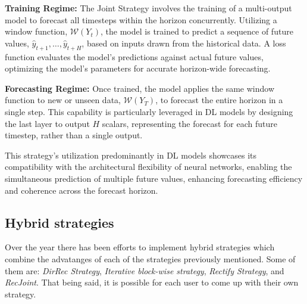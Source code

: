 \documentclass{article}
\begin{document}
\textbf{Training Regime:} The Joint Strategy involves the training of a multi-output model to forecast all timesteps within the horizon concurrently. Utilizing a window function, $\mathcal{W}(Y_t)$, the model is trained to predict a sequence of future values, $\hat{y}_{t+1}, \ldots, \hat{y}_{t+H}$, based on inputs drawn from the historical data. A loss function evaluates the model's predictions against actual future values, optimizing the model's parameters for accurate horizon-wide forecasting.

\textbf{Forecasting Regime:} Once trained, the model applies the same window function to new or unseen data, $\mathcal{W}(Y_T)$, to forecast the entire horizon in a single step. This capability is particularly leveraged in DL models by designing the last layer to output $H$ scalars, representing the forecast for each future timestep, rather than a single output.

This strategy's utilization predominantly in DL models showcases its compatibility with the architectural flexibility of neural networks, enabling the simultaneous prediction of multiple future values, enhancing forecasting efficiency and coherence across the forecast horizon.


\subsection{Hybrid strategies}
Over the year there has been efforts to implement hybrid strategies which combine the advatanges
of each of the strategies previously mentioned. Some of them are: \textit{DirRec Strategy}, \textit{Iterative block-wise strategy},
\textit{Rectify Strategy}, and \textit{RecJoint}. That being said, it is possible for each
user to come up with their own strategy.
\end{document}
